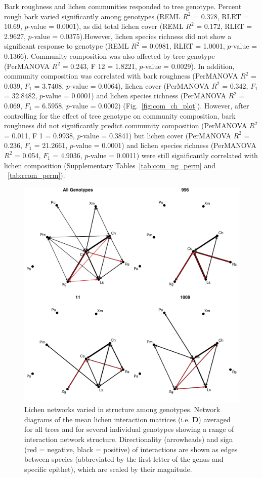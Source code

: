 \documentclass[9pt,twocolumn,twoside,lineno]{pnas-new}
\begin{document}
{Bark roughness and lichen communities responded to tree
genotype. Percent rough bark varied significantly among genotypes
(REML $R^2$ = 0.378, RLRT = 10.69, $p$-value = 0.0001), as did total
lichen cover (REML $R^2$ = 0.172, RLRT = 2.9627, $p$-value =
0.0375).However, lichen species richness did not show a significant
response to genotype (REML $R^2$ = 0.0981, RLRT = 1.0001, $p$-value =
0.1366). Community composition was also affected by tree genotype
(PerMANOVA $R^2$ = 0.243, F 12 = 1.8221, $p$-value = 0.0029). In
addition, community composition was correlated with bark roughness
(PerMANOVA $R^2$ = 0.039, $F_1$ = 3.7408, $p$-value = 0.0064), lichen
cover (PerMANOVA $R^2$ = 0.342, $F_1$ = 32.8482, $p$-value = 0.0001)
and lichen species richness (PerMANOVA $R^2$ = 0.069, $F_1$ = 6.5958,
$p$-value = 0.0002) (Fig.~\ref{fig:com_ch_plot}). However, after
controlling for the effect of tree genotype on community composition,
bark roughness did not significantly predict community composition
(PerMANOVA $R^2$ = 0.011, F 1 = 0.9938, $p$-value = 0.3841) but lichen
cover (PerMANOVA $R^2$ = 0.236, $F_1$ = 21.2661, $p$-value = 0.0001)
and lichen species richness (PerMANOVA $R^2$ = 0.054, $F_1$ = 4.9036,
$p$-value = 0.0011) were still significantly correlated with lichen
composition (Supplementary Tables~\ref{tab:com_ng_perm} and
~\ref{tab:rcom_perm}).


\begin{figure}[ht]
\centering
\includegraphics[width=\linewidth]{cn_onc.pdf}
\caption{Lichen networks varied in structure among genotypes. Network
  diagrams of the mean lichen interaction matrices (i.e. $\mathbf{D}$)
  averaged for all trees and for several individual genotypes showing
  a range of interaction network structure. Directionality
  (arrowheads) and sign (red = negative, black = positive) of
  interactions are shown as edges between species (abbreviated by the
  first letter of the genus and specific epithet), which are scaled by
  their magnitude.}
\label{fig:geno_nets}
\end{figure}


}
\end{document}
